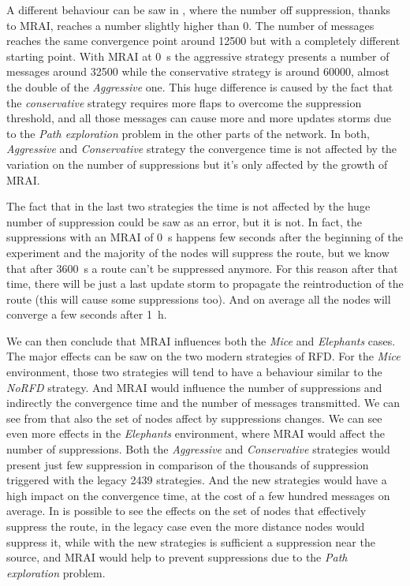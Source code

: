 A different behaviour can be saw in
,
where the number off suppression, thanks to \ac{MRAI}, reaches a number slightly
higher than \num{0}.
The number of messages reaches the same convergence point around \num{12500} but
with a completely different starting point.
With \ac{MRAI} at \SI{0}{\second} the aggressive strategy presents a number of
messages around \num{32500} while the conservative strategy is around \num{60000},
almost the double of the \textit{Aggressive} one.
This huge difference is caused by the fact that the \textit{conservative} strategy requires
more flaps to overcome the suppression threshold, and all those messages can
cause more and more updates storms due to the \textit{Path exploration} problem
in the other parts of the network.
In both, \textit{Aggressive} and \textit{Conservative} strategy the convergence
time is not affected by the variation on the number of suppressions but it's only
affected by the growth of \ac{MRAI}.

The fact that in the last two strategies the time is not affected by the huge number
of suppression could be saw as an error, but it is not.
In fact, the suppressions with an \ac{MRAI} of \SI{0}{\second} happens
few seconds after the beginning of the experiment and the majority of the nodes
will suppress the route, but we know that after \SI{3600}{\second} a route
can't be suppressed anymore.
For this reason after that time, there will be just a last update storm to propagate
the reintroduction of the route (this will cause some suppressions too).
And on average all the nodes will converge a few seconds after \SI{1}{\hour}.

We can then conclude that \ac{MRAI} influences both the \textit{Mice} and
\textit{Elephants} cases.
The major effects can be saw on the two modern strategies of \ac{RFD}.
For the \textit{Mice} environment, those two strategies will tend to have
a behaviour similar to the \textit{NoRFD} strategy. And \ac{MRAI} would
influence the number of suppressions and indirectly the convergence time
and the number of messages transmitted.
We can see from  that also the set of
nodes affect by suppressions changes.
We can see even more effects in the \textit{Elephants} environment, where
\ac{MRAI} would affect the number of suppressions.
Both the \textit{Aggressive} and \textit{Conservative} strategies would present
just few suppression in comparison of the thousands of suppression triggered with the
legacy \num{2439} strategies.
And the new strategies would have a high impact on the convergence time, at
the cost of a few hundred messages on average.
In  is possible to see the effects
on the set of nodes that effectively suppress the route, in the legacy
case even the more distance nodes would suppress it, while with the new
strategies is sufficient a suppression near the source, and \ac{MRAI} would
help to prevent suppressions due to the \textit{Path exploration} problem.

